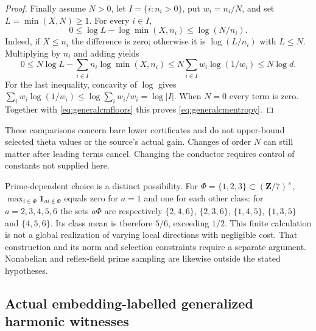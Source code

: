 \documentclass[11pt,a4paper]{article}
\theoremstyle{definition}\newtheorem{remark}[theorem]{Remark}
\begin{document}
\begin{proof}
Finally assume $N>0$, let $I=\{i:n_i>0\}$, put $w_i=n_i/N$,
and set $L=\min(X,N)\ge1$.
For every $i\in I$,
\[
 0\le\log L-\log\min(X,n_i)\le\log(N/n_i).
\]
Indeed, if $X\le n_i$ the difference is zero; otherwise it is
$\log(L/n_i)$ with $L\le N$.
Multiplying by $n_i$ and adding yields
\[
 0\le N\log L-\sum_{i\in I}n_i\log\min(X,n_i)
 \le N\sum_{i\in I}w_i\log(1/w_i)\le N\log d.
\]
For the last inequality, concavity of $\log$ gives
$\sum_iw_i\log(1/w_i)\le\log\sum_iw_i/w_i=\log|I|$.
When $N=0$ every term is zero.
Together with \eqref{eq:generalcmfloors} this proves
\eqref{eq:generalcmentropy}.
\end{proof}

These comparisons concern bare lower certificates and do not upper-bound
selected theta values or the source's actual gain. Changes of order $N$
can still matter after leading terms cancel. Changing the conductor
requires control of constants not supplied here.

Prime-dependent choice is a distinct possibility. For
$\Phi=\{1,2,3\}\subset(\mathbf Z/7)^\times$,
$\max_{i\in\Phi}\mathbf1_{ai\notin\Phi}$ equals zero for $a=1$
and one for each other class: for $a=2,3,4,5,6$ the sets $a\Phi$ are
respectively $\{2,4,6\}$, $\{2,3,6\}$, $\{1,4,5\}$,
$\{1,3,5\}$ and $\{4,5,6\}$.
Its class mean is therefore $5/6$, exceeding $1/2$.
This finite calculation is not a global realization of varying local
directions with negligible cost. That construction and its norm and
selection constraints require a separate argument. Nonabelian and
reflex-field prime sampling are likewise outside the stated hypotheses.


\subsection{Actual embedding-labelled generalized harmonic witnesses}
\end{document}

